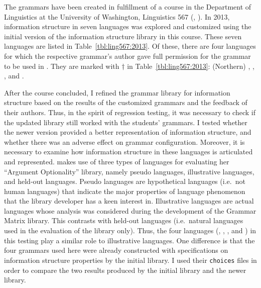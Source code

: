 The grammars have been created in fulfillment of a 
course in the Department of Linguistics at the University of
Washington, Linguistics 567
(, \citealt{bender:07}).
In 2013, information structure in seven languages was explored and
customized using the initial version of the information structure
library in this course.  These seven languages are listed in
Table~\ref{tbl:ling567:2013}.  Of these, there are four languages for
which the respective grammar's author gave full permission for the
grammar to be used in .  They are marked with
\ensuremath{\dagger} in Table~\ref{tbl:ling567:2013}: (Northern)
, , , and .


After the course concluded, I refined the grammar library for
information structure based on the results of the customized grammars
and the feedback of their authors.  Thus, in the spirit of regression
testing, it was necessary to check if the updated library still worked
with the students' grammars. I tested whether the
newer version provided a better representation of information
structure, and whether there was an adverse effect on grammar
configuration. Moreover, it is necessary to examine how information
structure in these languages is articulated and represented.
\citet{saleem:10} makes use of three types of languages for evaluating
her ``Argument Optionality'' library, namely pseudo languages,
illustrative languages, and held-out languages.
Pseudo languages are hypothetical languages 
(i.e.\ not human languages) that indicate the
major properties of language phenomenon that the library developer has
a keen interest in.  Illustrative languages are actual languages whose
analysis was considered during the development of the Grammar Matrix
library.  This contrasts with held-out languages (i.e.\ natural
languages used in the evaluation of the library only).  Thus, the four
languages (, , , and
) in this testing play a similar role to illustrative
languages.  One difference is that the four grammars used here were
already constructed with specifications on information structure
properties by the initial library.  I used their \texttt{choices}
files in order to compare the two results produced by the initial
library and the newer library.







